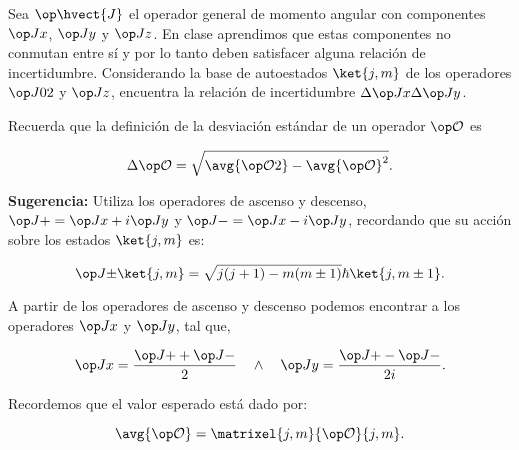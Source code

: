 \documentclass[./../main.tex]{subfiles}
\begin{document}
    \color{blue}
    \begin{exercise}
        Sea \(\observable{\hvect{J}}\) el operador general de momento angular con componentes \(\observable{J}[x]\), \(\observable{J}[y]\) y \(\observable{J}[z]\). En clase aprendimos que estas componentes no conmutan entre sí y por lo tanto deben satisfacer alguna relación de incertidumbre. Considerando la base de autoestados \(\ket{j, m}\) de los operadores \(\observable{J}[0][2]\) y \(\observable{J}[z]\), encuentra la relación de incertidumbre \(\change{\observable{J}[x]}\change{\observable{J}[y]}\).

        Recuerda que la definición de la desviación estándar de un operador \(\observable{\mathcal{O}}\) es

        \begin{equation}
            \change{\observable{\mathcal{O}}} = \sqrt{\avg{\observable{\mathcal{O}}[][2]} - \avg{\observable{\mathcal{O}}}^{2}}.
            \label{eq:RMS}
        \end{equation}

        \textbf{Sugerencia:} Utiliza los operadores de ascenso y descenso, \(\observable{J}[+] = \observable{J}[x] + i\observable{J}[y]\) y \(\observable{J}[-] = \observable{J}[x] - i\observable{J}[y]\), recordando que su acción sobre los estados \(\ket{j,m}\) es:

        \begin{equation*}
            \observable{J}[\pm]\ket{j,m} = \sqrt{j(j + 1) - m(m \pm 1)}\hbar\ket{j, m \pm 1}.
        \end{equation*}

        \color{black}
        \begin{solution}
            A partir de los operadores de ascenso y descenso podemos encontrar a los operadores \(\observable{J}[x]\) y \(\observable{J}[y]\), tal que,

            \begin{equation*}
                \observable{J}[x] = \dfrac{\observable{J}[+] + \observable{J}[-]}{2}\quad \wedge\quad \observable{J}[y] = \dfrac{\observable{J}[+] - \observable{J}[-]}{2i}.
            \end{equation*}

            Recordemos que el valor esperado está dado por:

            \begin{equation*}
                \avg{\observable{\mathcal{O}}} = \matrixel{j, m}{\observable{\mathcal{O}}}{j, m}.
            \end{equation*}


\end{solution}
\end{exercise}
\end{document}
